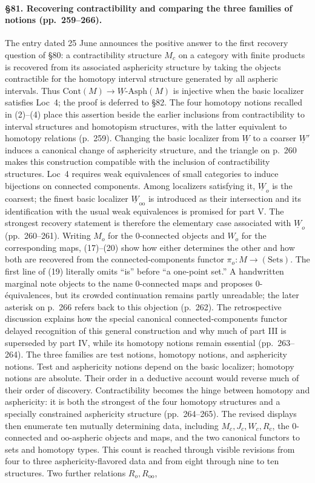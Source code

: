 \paragraph{\S81. Recovering contractibility and comparing the three families of notions (pp.\ 259--266).}
The entry dated 25 June announces the positive answer to the first recovery question of \S80: a contractibility structure $M_c$ on a category with finite products is recovered from its associated asphericity structure by taking the objects contractible for the homotopy interval structure generated by all aspheric intervals. Thus $\mathrm{Cont}(M)\to\underline{W}\text{-}\mathrm{Asph}(M)$ is injective when the basic localizer satisfies Loc~4; the proof is deferred to \S82. The four homotopy notions recalled in (2)--(4) place this assertion beside the earlier inclusions from contractibility to interval structures and homotopism structures, with the latter equivalent to homotopy relations (p.\ 259). Changing the basic localizer from $\underline{W}$ to a coarser $\underline{W}'$ induces a canonical change of asphericity structure, and the triangle on p.\ 260 makes this construction compatible with the inclusion of contractibility structures. Loc~4 requires weak equivalences of small categories to induce bijections on connected components. Among localizers satisfying it, $\underline{W}_o$ is the coarsest; the finest basic localizer $\underline{W}_{\mathrm{oo}}$ is introduced as their intersection and its identification with the usual weak equivalences is promised for part V. The strongest recovery statement is therefore the elementary case associated with $\underline{W}_o$ (pp.\ 260--261). Writing $M_o$ for the 0-connected objects and $W_o$ for the corresponding maps, (17)--(20) show how either determines the other and how both are recovered from the connected-components functor $\pi_o:M\to(\mathrm{Sets})$. The first line of (19) literally omits “is” before “a one-point set.” A handwritten marginal note objects to the name 0-connected maps and proposes 0-équivalences, but its crowded continuation remains partly unreadable; the later asterisk on p.\ 266 refers back to this objection (p.\ 262). The retrospective discussion explains how the special canonical connected-components functor delayed recognition of this general construction and why much of part III is superseded by part IV, while its homotopy notions remain essential (pp.\ 263--264). The three families are test notions, homotopy notions, and asphericity notions. Test and asphericity notions depend on the basic localizer; homotopy notions are absolute. Their order in a deductive account would reverse much of their order of discovery. Contractibility becomes the hinge between homotopy and asphericity: it is both the strongest of the four homotopy structures and a specially constrained asphericity structure (pp.\ 264--265). The revised displays then enumerate ten mutually determining data, including $M_c,J_c,W_c,R_c$, the 0-connected and $\mathrm{oo}$-aspheric objects and maps, and the two canonical functors to sets and homotopy types. This count is reached through visible revisions from four to three asphericity-flavored data and from eight through nine to ten structures. Two further relations $R_o,R_{\mathrm{oo}}$, 